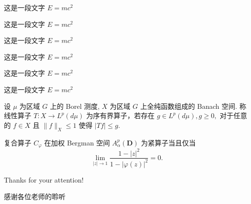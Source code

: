 \documentclass{whu-beamer}
\begin{document}
  
\begin{frame}
  \begin{lemma}
    这是一段文字 $E = m c^2$
  \end{lemma}
  
  \begin{axiom}
    这是一段文字 $E = m c^2$
  \end{axiom}
  
  \begin{antiexample}
    这是一段文字 $E = m c^2$
  \end{antiexample}
  
  \begin{conjecture}
    这是一段文字 $E = m c^2$
  \end{conjecture}
\end{frame}


\begin{frame}
  \begin{question}
    这是一段文字 $E = m c^2$
  \end{question}
  
  \begin{claim}
    这是一段文字 $E = m c^2$
  \end{claim}
\end{frame}


\begin{frame}
  \begin{definition}[序有界算子]
    设 $\mu$ 为区域 $G$ 上的 Borel 测度, $X$ 为区域 $G$ 上全纯函数组成的 Banach 空间. 称线性算子 $T:X\rightarrow L^{p}(d\mu)$ 为序有界算子，若存在 $g\in L^{p}(d\mu), g\geq0,$ 对于任意的 $f\in X$ 且 $\|f\|_{X}\leq1$ 使得 $|Tf|\leq g$.
  \end{definition}

  \begin{theorem}
    复合算子 $C_{\varphi}$ 在加权 Bergman 空间 $A^{p}_{\alpha}(\mathbf{D})$ 为紧算子当且仅当
    \[ 
      \lim_{|z|\rightarrow 1}\frac{1-|z|^{2}}{1-|\varphi(z)|^{2}}= 0.
    \]
  \end{theorem}
\end{frame}







\begin{acknowledgements}[color = blue!80]
  Thanks for your attention!

  感谢各位老师的聆听
\end{acknowledgements}
\end{document}
